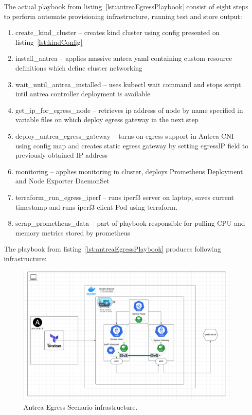 The actual playbook from listing~\ref{lst:antreaEgressPlaybook} consist of eight steps to perform automate provisioning infrastructure, running test and store output:
\begin{enumerate}
  \item create\_kind\_cluster -- creates kind cluster using config presented on listing~\ref{lst:kindConfig}
  \item install\_antrea -- applies massive antrea yaml containing custom resource definitions which define cluster networking 
  \item wait\_until\_antrea\_installed -- uses kubectl wait command and stops script intil antrea controller deployment is available
  \item get\_ip\_for\_egress\_node -- retrieves ip address of node by name specified in variable files on which deploy egress gateway in the next step 
  \item deploy\_antrea\_egress\_gateway -- turns on egress support in Antrea CNI using config map and creates static egress gateway by setting egressIP field to previously obtained IP address 
  \item monitoring -- applies monitoring in cluster, deploys Prometheus Deployment and Node Exporter DaemonSet
  \item terraform\_run\_egress\_iperf -- runs iperf3 server on laptop, saves current timestamp and runs iperf3 client Pod using terraform.
  \item scrap\_prometheus\_data -- part of playbook responsible for pulling CPU and memory metrics stored by prometheus
\end{enumerate}

The playbook from listing~\ref{lst:antreaEgressPlaybook} produces following infrastructure:

\begin{figure}[tbh]
  \centering
  \includegraphics[width=1\columnwidth]{images/antrea_egress_gatateway_cluster.png}
  \caption{Antrea Egress Scenario infrastructure.}
  \label{fig:antreaEgressScenarioArch}
\end{figure}


